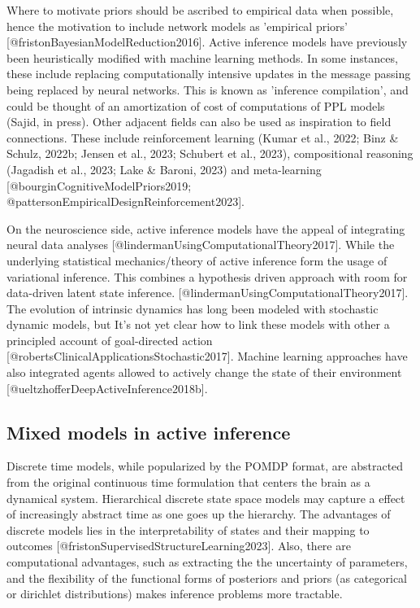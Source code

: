 \documentclass{article}
\begin{document}
Where to motivate priors should be ascribed to empirical data when possible, hence the motivation to include network models as 'empirical priors' [@fristonBayesianModelReduction2016]. Active inference models have previously been heuristically modified with machine learning methods. In some instances, these include replacing computationally intensive updates in the message passing being replaced by neural networks. This is known as 'inference compilation', and could be thought of an amortization of cost of computations of PPL models (Sajid, in press). Other adjacent fields can also be used as inspiration to field connections. These include reinforcement learning (Kumar et al., 2022; Binz & Schulz, 2022b; Jensen et al., 2023; Schubert et al., 2023), compositional reasoning (Jagadish et al., 2023; Lake & Baroni, 2023) and meta-learning [@bourginCognitiveModelPriors2019; @pattersonEmpiricalDesignReinforcement2023].

On the neuroscience side, active inference models have the appeal of integrating neural data analyses [@lindermanUsingComputationalTheory2017]. While the underlying statistical mechanics/theory of active inference form the usage of variational inference. This combines a hypothesis driven approach with room for data-driven latent state inference. [@lindermanUsingComputationalTheory2017]. The evolution of intrinsic dynamics has long been modeled with stochastic dynamic models, but It's not yet clear how to link these models with other a principled account of goal-directed action [@robertsClinicalApplicationsStochastic2017]. Machine learning approaches have also integrated agents allowed to actively change the state of their environment [@ueltzhofferDeepActiveInference2018b].

\subsection{Mixed models in active inference}

Discrete time models, while popularized by the POMDP format, are abstracted from the original continuous time formulation that centers the brain as a dynamical system. Hierarchical discrete state space models may capture a effect of increasingly abstract time as one goes up the hierarchy. The advantages of discrete models lies in the interpretability of states and their mapping to outcomes [@fristonSupervisedStructureLearning2023]. Also, there are computational advantages, such as extracting the the uncertainty of parameters, and the flexibility of the functional forms of posteriors and priors (as categorical or dirichlet distributions) makes inference problems more tractable.
\end{document}
